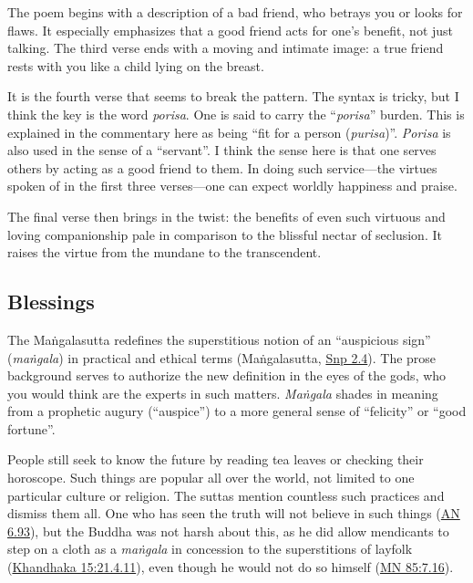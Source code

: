 \documentclass[12pt,openany]{book}%
\begin{document}
The poem begins with a description of a bad friend, who betrays you or looks for flaws. It especially emphasizes that a good friend acts for one’s benefit, not just talking. The third verse ends with a moving and intimate image: a true friend rests with you like a child lying on the breast.

It is the fourth verse that seems to break the pattern. The syntax is tricky, but I think the key is the word \textit{porisa}. One is said to carry the “\textit{porisa}” burden. This is explained in the commentary here as being “fit for a person (\textit{purisa})”. \textit{Porisa} is also used in the sense of a “servant”. I think the sense here is that one serves others by acting as a good friend to them. In doing such service—the virtues spoken of in the first three verses—one can expect worldly happiness and praise.

The final verse then brings in the twist: the benefits of even such virtuous and loving companionship pale in comparison to the blissful nectar of seclusion. It raises the virtue from the mundane to the transcendent.

\subsection*{Blessings}

The \textsanskrit{Maṅgalasutta} redefines the superstitious notion of an “auspicious sign” (\textit{\textsanskrit{maṅgala}}) in practical and ethical terms (\textsanskrit{Maṅgalasutta}, \href{https://suttacentral.net/snp2.4/en/sujato}{Snp 2.4}). The prose background serves to authorize the new definition in the eyes of the gods, who you would think are the experts in such matters. \textit{\textsanskrit{Maṅgala}} shades in meaning from a prophetic augury (“auspice”) to a more general sense of “felicity” or “good fortune”.

People still seek to know the future by reading tea leaves or checking their horoscope. Such things are popular all over the world, not limited to one particular culture or religion. The suttas mention countless such practices and dismiss them all. One who has seen the truth will not believe in such things (\href{https://suttacentral.net/an6.93/en/sujato}{AN 6.93}), but the Buddha was not harsh about this, as he did allow mendicants to step on a cloth as a \textit{\textsanskrit{maṅgala}} in concession to the superstitions of layfolk (\href{https://suttacentral.net/pli{-}tv{-}kd15/en/brahmali\#21.4.11}{Khandhaka 15:21.4.11}), even though he would not do so himself (\href{https://suttacentral.net/mn85/en/sujato\#7.16}{MN 85:7.16}).
\end{document}
